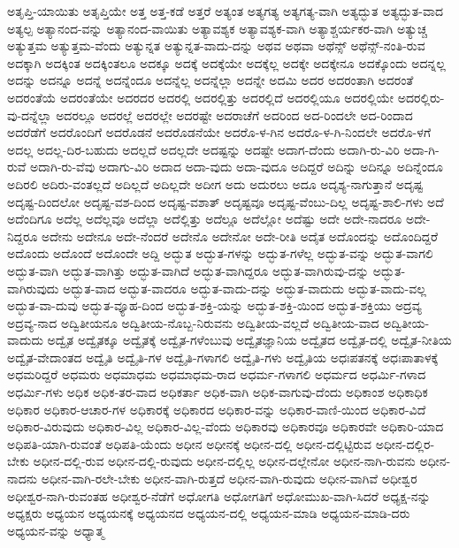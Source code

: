 {ಅತೃಪ್ತಿ-ಯಾಯಿತು
ಅತೃಪ್ತಿಯೇ
ಅತ್ತ
ಅತ್ತ-ಕಡೆ
ಅತ್ತರೆ
ಅತ್ಯಂತ
ಅತ್ಯಗತ್ಯ
ಅತ್ಯಗತ್ಯ-ವಾಗಿ
ಅತ್ಯದ್ಭುತ
ಅತ್ಯದ್ಭುತ-ವಾದ
ಅತ್ಯಲ್ಪ
ಅತ್ಯಾನಂದ-ವನ್ನು
ಅತ್ಯಾನಂದ-ವಾಯಿತು
ಅತ್ಯಾವಶ್ಯಕ
ಅತ್ಯಾವಶ್ಯಕ-ವಾಗಿ
ಅತ್ಯಾಶ್ಚರ್ಯಕರ-ವಾಗಿ
ಅತ್ಯುಚ್ಚ
ಅತ್ಯುತ್ತಮ
ಅತ್ಯುತ್ತಮ-ವೆಂದು
ಅತ್ಯುನ್ನತ
ಅತ್ಯುನ್ನತ-ವಾದು-ದನ್ನು
ಅಥವ
ಅಥವಾ
ಅಥೆನ್ಸ್
ಅಥೆನ್ಸ್-ನಂತಿ-ರುವ
ಅದಕ್ಕಾಗಿ
ಅದಕ್ಕಿಂತ
ಅದಕ್ಕಿಂತಲೂ
ಅದಕ್ಕೂ
ಅದಕ್ಕೆ
ಅದಕ್ಕೆಯೇ
ಅದಕ್ಕೆಲ್ಲ
ಅದಕ್ಕೇ
ಅದಕ್ಕೇನೂ
ಅದಕ್ಕೊಂದು
ಅದನ್ನಲ್ಲ
ಅದನ್ನು
ಅದನ್ನೂ
ಅದನ್ನೆ
ಅದನ್ನೆಂದೂ
ಅದನ್ನೆಲ್ಲ
ಅದನ್ನೆಲ್ಲಾ
ಅದನ್ನೇ
ಅದಮಿ
ಅದರ
ಅದರಂತಾಗಿ
ಅದರಂತೆ
ಅದರಂತೆಯೆ
ಅದರಂತೆಯೇ
ಅದರದರ
ಅದರಲ್ಲಿ
ಅದರಲ್ಲಿತ್ತು
ಅದರಲ್ಲಿದೆ
ಅದರಲ್ಲಿಯೂ
ಅದರಲ್ಲಿಯೇ
ಅದರಲ್ಲಿರು-ವು-ದನ್ನೆಲ್ಲಾ
ಅದರಲ್ಲೂ
ಅದರಲ್ಲೆ
ಅದರಲ್ಲೇ
ಅದರಷ್ಟೇ
ಅದರಾಚೆಗೆ
ಅದರಿಂದ
ಅದ-ರಿಂದಲೇ
ಅದ-ರಿಂದಾದ
ಅದರೆಡೆಗೆ
ಅದರೊಂದಿಗೆ
ಅದರೊಡನೆ
ಅದರೊಡನೆಯೇ
ಅದರೊ-ಳ-ಗಿನ
ಅದರೊ-ಳ-ಗಿ-ನಿಂದಲೇ
ಅದರೊ-ಳಗೆ
ಅದಲ್ಲ
ಅದಲ್ಲ-ದಿರ-ಬಹುದು
ಅದಲ್ಲದೆ
ಅದಲ್ಲದೇ
ಅದಷ್ಟನ್ನು
ಅದಷ್ಟೇ
ಅದಾಗ-ದೆಂದು
ಅದಾಗಿ-ರು-ವಿರಿ
ಅದಾ-ಗಿ-ರುವೆ
ಅದಾಗಿ-ರು-ವೆವು
ಅದಾಗು-ವಿರಿ
ಅದಾದ
ಅದಾ-ವುದು
ಅದಾ-ವುದೂ
ಅದಿದ್ದರೆ
ಅದಿನ್ನು
ಅದಿನ್ನೂ
ಅದಿನ್ನೆಂದೂ
ಅದಿರಲಿ
ಅದಿರು-ವಂತಲ್ಲದೆ
ಅದಿಲ್ಲದೆ
ಅದಿಲ್ಲದೇ
ಅದೀಗ
ಅದು
ಅದುರಲು
ಅದೂ
ಅದೃಶ್ಯ-ನಾಗುತ್ತಾನೆ
ಅದೃಷ್ಟ
ಅದೃಷ್ಟ-ದಿಂದಲೋ
ಅದೃಷ್ಟ-ವಶ-ದಿಂದ
ಅದೃಷ್ಟ-ವಶಾತ್
ಅದೃಷ್ಟವೂ
ಅದೃಷ್ಟ-ವೆಂಬು-ದಿಲ್ಲ
ಅದೃಷ್ಟ-ಶಾಲಿ-ಗಳು
ಅದೆ
ಅದೆಂದಿಗೂ
ಅದೆಲ್ಲ
ಅದೆಲ್ಲವೂ
ಅದೆಲ್ಲಾ
ಅದೆಲ್ಲಿತ್ತು
ಅದೆಲ್ಲೂ
ಅದೆಲ್ಲೋ
ಅದೆಷ್ಟು
ಅದೇ
ಅದೇ-ನಾದರೂ
ಅದೇ-ನಿದ್ದರೂ
ಅದೇನು
ಅದೇನೂ
ಅದೇ-ನೆಂದರೆ
ಅದೇನೊ
ಅದೇನೋ
ಅದೇ-ರೀತಿ
ಅದೈತ
ಅದೊಂದನ್ನು
ಅದೊಂದಿದ್ದರೆ
ಅದೊಂದು
ಅದೊಂದೆ
ಅದೊಂದೇ
ಅದ್ದಿ
ಅದ್ಭುತ
ಅದ್ಭುತ-ಗಳನ್ನು
ಅದ್ಭುತ-ಗಳೆಲ್ಲ
ಅದ್ಭುತ-ವನ್ನು
ಅದ್ಭುತ-ವಾಗಲಿ
ಅದ್ಭುತ-ವಾಗಿ
ಅದ್ಭುತ-ವಾಗಿತ್ತು
ಅದ್ಭುತ-ವಾಗಿದೆ
ಅದ್ಭುತ-ವಾಗಿದ್ದರೂ
ಅದ್ಭುತ-ವಾಗಿರುವು-ದನ್ನು
ಅದ್ಭುತ-ವಾಗಿರುವುದು
ಅದ್ಭುತ-ವಾದ
ಅದ್ಭುತ-ವಾದರೂ
ಅದ್ಭುತ-ವಾದು-ದನ್ನು
ಅದ್ಭುತ-ವಾದುದು
ಅದ್ಭುತ-ವಾದು-ವಲ್ಲ
ಅದ್ಭುತ-ವಾ-ದುವು
ಅದ್ಭುತ-ವ್ಯೂಹ-ದಿಂದ
ಅದ್ಭುತ-ಶಕ್ತಿ-ಯನ್ನು
ಅದ್ಭುತ-ಶಕ್ತಿ-ಯಿಂದ
ಅದ್ಭುತ-ಶಕ್ತಿಯು
ಅದ್ರವ್ಯ
ಅದ್ರವ್ಯ-ನಾದ
ಅದ್ವಿತೀಯನೂ
ಅದ್ವಿತೀಯ-ನೊಬ್ಬ-ನಿರುವನು
ಅದ್ವಿತೀಯ-ವಲ್ಲದೆ
ಅದ್ವಿತೀಯ-ವಾದ
ಅದ್ವಿತೀಯ-ವಾದುದು
ಅದ್ವೈತ
ಅದ್ವೈತಕ್ಕೂ
ಅದ್ವೈತಕ್ಕೆ
ಅದ್ವೈತ-ಗಳೆಂಬುವು
ಅದ್ವೈತಜ್ಞಾನಿಯ
ಅದ್ವೈತದ
ಅದ್ವೈತ-ದಲ್ಲಿ
ಅದ್ವೈತ-ನೀತಿಯ
ಅದ್ವೈತ-ವೇದಾಂತದ
ಅದ್ವೈತಿ
ಅದ್ವೈತಿ-ಗಳ
ಅದ್ವೈತಿ-ಗಳಾಗಲಿ
ಅದ್ವೈತಿ-ಗಳು
ಅದ್ವೈತಿಯ
ಅಧಃಪತನಕ್ಕೆ
ಅಧಃಪಾತಾಳಕ್ಕೆ
ಅಧಮರಿದ್ದರೆ
ಅಧಮರು
ಅಧಮಾಧಮ
ಅಧಮಾಧಮ-ರಾದ
ಅಧರ್ಮ-ಗಳಾಗಲಿ
ಅಧರ್ಮದ
ಅಧರ್ಮಿ-ಗಳಾದ
ಅಧರ್ಮಿ-ಗಳು
ಅಧಿಕ
ಅಧಿಕ-ತರ-ವಾದ
ಅಧಿಕರ್ತಾ
ಅಧಿಕ-ವಾಗಿ
ಅಧಿಕ-ವಾಗುವು-ದೆಂದು
ಅಧಿಕಾಂಶ
ಅಧಿಕಾಧಿಕ
ಅಧಿಕಾರ
ಅಧಿಕಾರ-ಆಚಾರ-ಗಳ
ಅಧಿಕಾರಕ್ಕೆ
ಅಧಿಕಾರದ
ಅಧಿಕಾರ-ವನ್ನು
ಅಧಿಕಾರ-ವಾಣಿ-ಯಿಂದ
ಅಧಿಕಾರ-ವಿದೆ
ಅಧಿಕಾರ-ವಿರುವುದು
ಅಧಿಕಾರ-ವಿಲ್ಲ
ಅಧಿಕಾರ-ವಿಲ್ಲ-ವೆಂದು
ಅಧಿಕಾರವು
ಅಧಿಕಾರವೂ
ಅಧಿಕಾರವೇ
ಅಧಿಕಾರಿ-ಯಾದ
ಅಧಿಪತಿ-ಯಾಗಿ-ರುವಂತೆ
ಅಧಿಪತಿ-ಯೆಂದು
ಅಧೀನ
ಅಧೀನಕ್ಕೆ
ಅಧೀನ-ದಲ್ಲಿ
ಅಧೀನ-ದಲ್ಲಿಟ್ಟಿರುವ
ಅಧೀನ-ದಲ್ಲಿರ-ಬೇಕು
ಅಧೀನ-ದಲ್ಲಿ-ರುವ
ಅಧೀನ-ದಲ್ಲಿ-ರುವುದು
ಅಧೀನ-ದಲ್ಲಿಲ್ಲ
ಅಧೀನ-ದಲ್ಲೇನೋ
ಅಧೀನ-ನಾಗಿ-ರುವನು
ಅಧೀನ-ನಾದನು
ಅಧೀನ-ವಾಗಿ-ರಲೇ-ಬೇಕು
ಅಧೀನ-ವಾಗಿ-ರುತ್ತದೆ
ಅಧೀನ-ವಾಗಿ-ರುವುದು
ಅಧೀನ-ವಾಗಿವೆ
ಅಧೀಶ್ವರ
ಅಧೀಶ್ವರ-ನಾಗಿ-ರುವಂತಹ
ಅಧೀಶ್ವರ-ನೆಡೆಗೆ
ಅಧೋಗತಿ
ಅಧೋಗತಿಗೆ
ಅಧೋಮುಖ-ವಾಗಿ-ಸಿದರೆ
ಅಧ್ಯಕ್ಷ-ನನ್ನು
ಅಧ್ಯಕ್ಷರು
ಅಧ್ಯಯನ
ಅಧ್ಯಯನಕ್ಕೆ
ಅಧ್ಯಯನದ
ಅಧ್ಯಯನ-ದಲ್ಲಿ
ಅಧ್ಯಯನ-ಮಾಡಿ
ಅಧ್ಯಯನ-ಮಾಡಿ-ದರು
ಅಧ್ಯಯನ-ವನ್ನು
ಅಧ್ಯಾತ್ಮ
}
